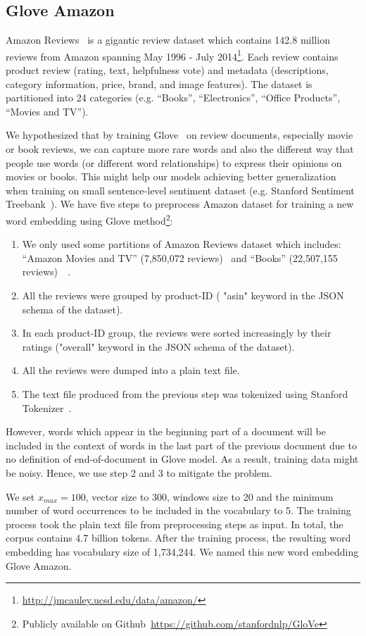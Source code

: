\subsection{Glove Amazon}\label{sec:glove-amazon}
Amazon Reviews~\cite{amazon-reviews} is a gigantic review dataset
which contains 142.8 million reviews from Amazon spanning May 1996 - July 2014\footnote{\url{http://jmcauley.ucsd.edu/data/amazon/}}.
Each review contains product review (rating, text, helpfulness vote) and metadata (descriptions, category information, price, brand, and image features).
The dataset is partitioned into 24 categories (e.g. ``Books'', ``Electronics'', ``Office Products'', ``Movies and TV'').

We hypothesized that by training Glove~\cite{glove} on review documents, especially movie or book reviews, we can capture more rare words and also the different way that people use words (or different word relationships) to express their opinions on movies or books.
This might help our models achieving better generalization when training on small sentence-level sentiment dataset (e.g. Stanford Sentiment Treebank~\cite{socher2013recursive}).
%
We have five steps to preprocess Amazon dataset for training a new word embedding using Glove method\footnote{Publicly available on Github~\url{https://github.com/stanfordnlp/GloVe}}:
\begin{enumerate}
	\item We only used some partitions of Amazon Reviews dataset which includes:  ``Amazon Movies and TV'' (7,850,072 reviews)~\cite{mcauley2013hidden} and ``Books'' (22,507,155 reviews)~\cite{McAuleyTSH15}~\cite{HeM16}.
	\item All the reviews were grouped by product-ID ( "asin" keyword in the JSON schema of the dataset).
	\item In each product-ID group, the reviews were sorted increasingly by their ratings ("overall" keyword in the JSON schema of the dataset).
	\item All the reviews were dumped into a plain text file.
	\item The text file produced from the previous step was tokenized using Stanford Tokenizer~\cite{tokenizerpart}.
\end{enumerate}
However, words which appear in the beginning part of a document will be included in the context of words in the last part of the previous document due to no definition of end-of-document in Glove model. As a result, training data might be noisy. Hence, we use step 2 and 3 to mitigate the problem.

We set $x_{max} = 100$, vector size to 300, windows size to 20 and the minimum number of word occurrences to be included in the vocabulary to 5.
The training process took the plain text file from preprocessing steps as input.
In total, the corpus contains 4.7 billion tokens.
After the training process, the resulting word embedding has vocabulary size of 1,734,244.
We named this new word embedding Glove Amazon.
